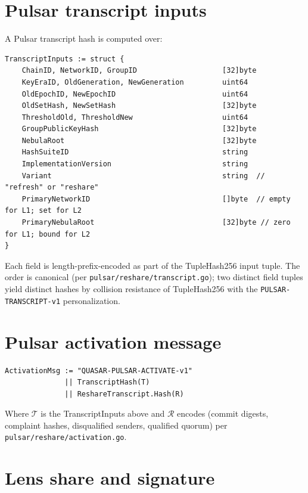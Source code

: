 \documentclass[11pt,a4paper]{article}
\begin{document}
\section{Pulsar transcript inputs}
\label{sec:pulsar-transcript}

A Pulsar transcript hash is computed over:

\begin{lstlisting}
TranscriptInputs := struct {
    ChainID, NetworkID, GroupID                    [32]byte
    KeyEraID, OldGeneration, NewGeneration         uint64
    OldEpochID, NewEpochID                         uint64
    OldSetHash, NewSetHash                         [32]byte
    ThresholdOld, ThresholdNew                     uint64
    GroupPublicKeyHash                             [32]byte
    NebulaRoot                                     [32]byte
    HashSuiteID                                    string
    ImplementationVersion                          string
    Variant                                        string  // "refresh" or "reshare"
    PrimaryNetworkID                               []byte  // empty for L1; set for L2
    PrimaryNebulaRoot                              [32]byte // zero for L1; bound for L2
}
\end{lstlisting}

Each field is length-prefix-encoded as part of the TupleHash256 input tuple. The order is canonical (per \texttt{pulsar/reshare/transcript.go}); two distinct field tuples yield distinct hashes by collision resistance of TupleHash256 with the \texttt{PULSAR-TRANSCRIPT-v1} personalization.

\section{Pulsar activation message}

\begin{lstlisting}
ActivationMsg := "QUASAR-PULSAR-ACTIVATE-v1"
              || TranscriptHash(T)
              || ReshareTranscript.Hash(R)
\end{lstlisting}

Where $\mathcal{T}$ is the TranscriptInputs above and $\mathcal{R}$ encodes (commit digests, complaint hashes, disqualified senders, qualified quorum) per \texttt{pulsar/reshare/activation.go}.

\section{Lens share and signature}
\end{document}

